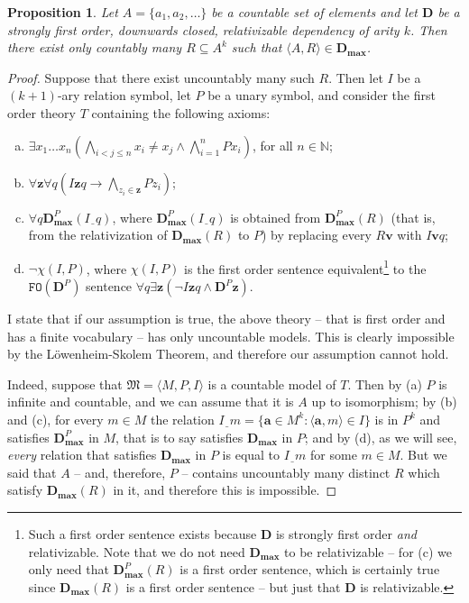 \documentclass{article}
\newtheorem{Proposition}[Theorem]{Proposition}
\theoremstyle{definition}
\newcommand{\tuple}{\mathbf}
\newcommand{\FO}{\texttt{FO}}
\newcommand{\M}{\mathfrak M}
\newcommand{\D}{\mathbf D}
\newcommand{\Dmax}{\mathbf D_{\textbf{max}}}
\newcommand{\h}{\underline{~~}}
\begin{document}
\begin{Proposition}
	Let $A = \{a_1, a_2, \ldots\}$ be a countable set of elements and let $\D$ be a strongly first order, downwards closed, relativizable dependency of arity $k$. Then there exist only countably many $R \subseteq A^k$ such that $\langle A, R\rangle \in \Dmax$.
	\label{propo:countable}
\end{Proposition}
\begin{proof}
	Suppose that there exist uncountably many such $R$. Then let $I$ be a $(k+1)$-ary relation symbol, let $P$ be a unary symbol, and consider the first order theory $T$ containing the following axioms: 
	\begin{enumerate}[(a)]
		\item $\exists x_1 \ldots x_n \left(\bigwedge_{i<j\leq n} x_i \not = x_j \wedge \bigwedge_{i=1}^n Px_i\right)$, for all $n \in \mathbb N$;
		\item $\forall \tuple z \forall q (I \tuple z q \rightarrow \bigwedge_{z_i \in \tuple z} Pz_i)$;
		\item $\forall q \Dmax^P(I\h q)$, where $\Dmax^P(I\h q)$ is obtained from $\Dmax^P(R)$ (that is, from the relativization of $\Dmax(R)$ to $P$) by replacing every $R \tuple v$ with $I \tuple v q$; 
		\item $\lnot \chi(I, P)$, where $\chi(I, P)$ is the first order sentence equivalent\footnote{Such a first order sentence exists because $\D$ is strongly first order \emph{and} relativizable. Note that we do not need $\Dmax$ to be relativizable -- for (c) we only need that $\Dmax^P(R)$ is a first order sentence, which is certainly true since $\Dmax(R)$ is a first order sentence -- but just that $\D$ is relativizable.} to the $\FO(\D^P)$ sentence $\forall q \exists \tuple z( \lnot I \tuple z q \wedge \D^P \tuple z)$.
	\end{enumerate}
	I state that if our assumption is true, the above theory  -- that is first order and has a finite vocabulary -- has only uncountable models. This is clearly impossible by the L\"owenheim-Skolem Theorem, and therefore our assumption cannot hold.
	
	Indeed, suppose that $\M = \langle M, P, I\rangle$ is a countable model of $T$. Then by (a) $P$ is infinite and countable, and we can assume that it is $A$ up to isomorphism; by (b) and (c), for every $m \in M$ the relation $I \h m = \{\tuple a \in M^k: \langle \tuple a, m\rangle \in I\}$ is in $P^k$ and satisfies $\Dmax^P$ in $M$, that is to say satisfies $\Dmax$ in $P$; and by (d), as we will see, \emph{every} relation that satisfies $\Dmax$ in $P$ is equal to $I \h m$ for some $m \in M$. But we said that $A$ -- and, therefore, $P$ -- contains uncountably many distinct $R$ which satisfy $\Dmax(R)$ in it, and therefore this is impossible. 


\end{proof}
\end{document}
